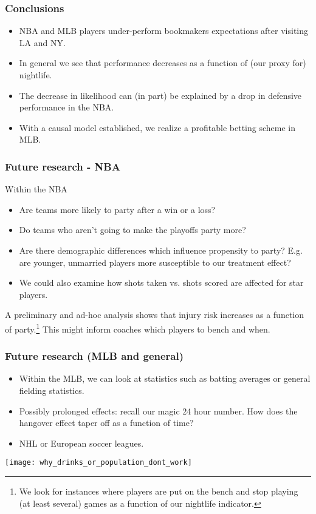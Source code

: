 \documentclass{beamer}
\begin{document}
\begin{frame}   \frametitle{Conclusions}
  \begin{itemize}
    \vspace{12pt}
    \item NBA and MLB players under-perform bookmakers expectations after visiting LA and NY.
    \vspace{12pt}
    \item In general we see that performance decreases as a function of (our proxy for) nightlife.     
    \vspace{12pt}
      \item The decrease in likelihood can (in part) be explained by a drop in defensive performance in the NBA.
    \vspace{12pt}
    \item With a causal model established, we realize a profitable betting scheme in MLB.   
  \end{itemize} 
\end{frame}


\begin{frame}   \frametitle{Future research - NBA}
  Within the NBA
  \begin{itemize}     
    \item Are teams more likely to party after a win or a       loss?
    \item Do teams who aren't going to make the playoffs party more?
    \item Are there demographic differences which influence propensity to party? E.g. are younger, unmarried players more susceptible to our treatment effect?
    \item We could also examine how shots taken vs. shots scored are affected for star players.
  \end{itemize}
  \vspace{12pt}  A preliminary and ad-hoc analysis shows that injury risk increases as a function of party.\footnote{We look for instances where players are put on the bench and stop playing (at least several) games as a function of our nightlife indicator.}
  This might inform coaches which players to bench and when.
\end{frame}

\begin{frame}   \frametitle{Future research (MLB and general)}
  \begin{itemize}     
    \item Within the MLB, we can look at statistics such as batting averages or general fielding statistics. 
    \vspace{12pt}
    \item Possibly prolonged effects: recall our magic 24 hour number.
      How does the hangover effect taper off as a function of time?
    \vspace{12pt}
    \item NHL or European soccer leagues.   
  \end{itemize} 
\end{frame}

\begin{frame}   
  \texttt{[image: why\_drinks\_or\_population\_dont\_work]} \end{frame}
\end{document}
